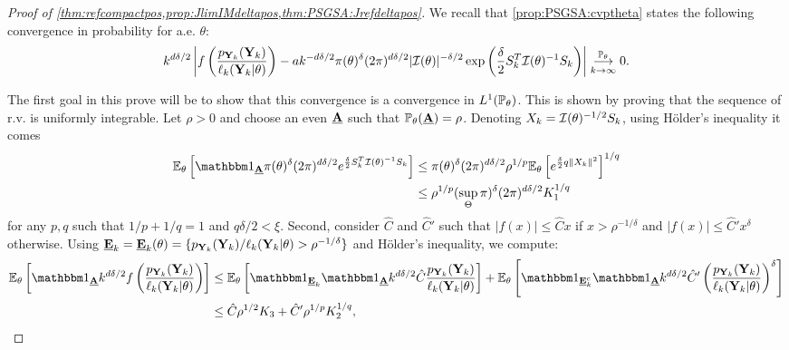 \begin{proof}[Proof of \cref{thm:refcompactpos,prop:JlimIMdeltapos,thm:PSGSA:Jrefdeltapos}]
We recall that \cref{prop:PSGSA:cvptheta} states the following convergence in probability for a.e. $\theta$:
\begin{equation}
    k^{d\delta/2}\left|f\left(\frac{p_{\mbf Y_k}(\mbf Y_k)}{\ell_k(\mbf Y_k|\theta)}\right)  - a k^{-d\delta/2}\pi(\theta)^\delta(2\pi)^{d\delta/2}|\cI(\theta)|^{-\delta/2}\exp\left(\frac{\delta}{2} S_k^T\cI(\theta)^{-1}S_k \right)  \right|
        \conv[\PP_\theta]{k\rightarrow\infty}0.
\end{equation}
    

The first goal in this prove will be to show that this convergence  is a convergence in $L^1(\PP_\theta)$. This is shown by proving that the sequence of r.v. is uniformly integrable. 
Let $\rho>0$ and choose an even $\ubf A$ such that $\PP_\theta(\ubf A)=\rho$. Denoting $X_k=\cI(\theta)^{-1/2}S_k$, using Hölder's inequality it comes
\begin{align}\label{eq:equiintpart1}
    \EE_\theta\left[\indic_{\ubf A} \pi(\theta)^\delta(2\pi)^{d\delta/2}e^{\frac{\delta}{2}S_k^T\cI(\theta)^{-1}S_k}\right]  
        &\leq \pi(\theta)^\delta(2\pi)^{d\delta/2} \rho^{1/p} \EE_\theta\left[e^{\frac{\delta}{2}q\|X_k\|^2}\right]^{1/q} \nonumber\\
        &\leq \rho^{1/p}(\sup_{\Theta}\pi)^\delta (2\pi)^{d\delta/2}K_1^{1/q}
\end{align}
for any $p,q$ such that $1/p+1/q=1$ and $q\delta/2<\xi$. %
Second, consider $\hat C$ and $\hat C'$ such that $|f(x)|\leq\hat Cx$ if $x>\rho^{-1/\delta}$ and $|f(x)|\leq \hat C'x^\delta$ otherwise.
Using $\ubf E_k= \ubf E_k(\theta)=\{p_{\mbf Y_k}(\mbf Y_k)/\ell_k(\mbf Y_k|\theta)>\rho^{-1/\delta}\}$ and Hölder's inequality, we compute:
    \begin{align}
 \EE_\theta\left[ \indic_{\ubf A}k^{d\delta/2}f\left( \frac{p_{\mbf Y_k}(\mbf Y_k)}{\ell_k(\mbf Y_k|\theta)}\right) \right]
%    
\nonumber                  &\leq \EE_\theta\left[ \indic_{\ubf E_k}\indic_{\ubf A} k^{d\delta/2} \hat C  \frac{p_{\mbf Y_k}(\mbf Y_k)}{\ell_k(\mbf Y_k|\theta)} \right] + \EE_\theta\left[ \indic_{\ubf E_k^c}\indic_{\ubf A}k^{d\delta/2}\hat C'\left( \frac{p_{\mbf Y_k}(\mbf Y_k)}{\ell_k(\mbf Y_k|\theta)}\right)^\delta \right] \\
 \label{eq:equiintpart2}
                & \leq \hat C\rho^{1/2} K_3 +  \hat C'\rho^{1/p} K_2^{1/q} , %

\end{align}
\end{proof}
